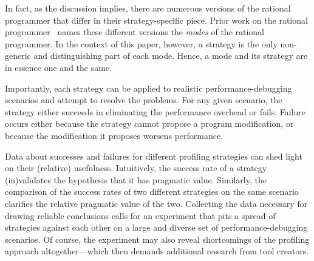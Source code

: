 In fact, as the discussion implies, there are numerous versions of the
rational programmer that differ in their strategy-specific piece. Prior
work on the rational programmer~\cite{lgfd-icfp-2021} names these different
versions the \emph{modes} of the rational programmer.  In the context of
this paper, however, a strategy is the only non-generic and distinguishing
part of each mode. Hence, a mode and its strategy are in essence one and
the same. 

Importantly, each strategy can be applied to realistic
performance-debugging scenarios and attempt to resolve the problems.  For
any given scenario, the strategy either succeeds in eliminating the
performance overhead or fails. Failure occurs either because the strategy
cannot propose a program modification, or because the modification it
proposes worsens performance. 

Data about successes and failures for different profiling strategies can
shed light on their (relative) usefulness.  Intuitively, the success rate
of a strategy (in)validates the hypothesis that it has pragmatic value.
Similarly, the comparison of the success rates of two different strategies
on the same scenario clarifies the relative pragmatic value of the two.
Collecting the data necessary for drawing reliable conclusions calls for
an experiment that pits a spread of strategies against each other on a
large and diverse set of performance-debugging scenarios. Of course, the
experiment may also reveal shortcomings of the profiling approach
altogether---which then demands additional research from tool creators. 
